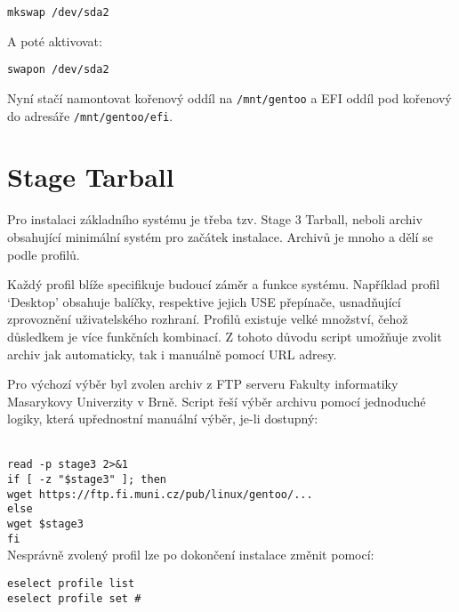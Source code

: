 \documentclass[12pt,a4paper,twoside,]{article}
\begin{document}
{\texttt{mkswap /dev/sda2}

\hspace*{-1.5em}A poté aktivovat:

\texttt{swapon /dev/sda2}

\hspace*{-1.5em}Nyní stačí namontovat kořenový oddíl na \texttt{/mnt/gentoo} a EFI oddíl pod kořenový do adresáře \texttt{/mnt/gentoo/efi}.

\newpage
\section{Stage Tarball}
{Pro instalaci základního systému je třeba tzv. Stage 3 Tarball, neboli archiv obsahující
minimální systém pro začátek instalace. Archivů je mnoho a dělí se podle profilů.

\hspace*{-1.5em}Každý profil blíže specifikuje budoucí záměr a funkce systému. Například profil
‘Desktop’ obsahuje balíčky, respektive jejich USE přepínače, usnadňující zprovoznění
uživatelského rozhraní.
Profilů existuje velké množství, čehož důsledkem je více funkčních kombinací. Z
tohoto důvodu script umožňuje zvolit archiv jak automaticky, tak i manuálně pomocí
URL adresy. 

\hspace*{-1.5em}Pro výchozí výběr byl zvolen archiv z FTP serveru Fakulty informatiky
Masarykovy Univerzity v Brně. Script řeší výběr archivu pomocí jednoduché logiky,
která upřednostní manuální výběr, je-li dostupný:}\\

\texttt{\hspace*{-1.5em}read -p stage3 2>\&1}\\
\texttt{if [ -z "\$stage3" ]; then}\\
\texttt{\hspace*{+1.5em}wget https://ftp.fi.muni.cz/pub/linux/gentoo/...\\}
\texttt{else}\\
\texttt{\hspace*{+1.5em}wget \$stage3}\\
\texttt{fi}\\

{\hspace*{-1.5em}Nesprávně zvolený profil lze po dokončení instalace změnit pomocí:\\}

\texttt{eselect profile list}\\
\texttt{\hspace*{--1.5em}eselect profile set \#}\\

}
\end{document}
